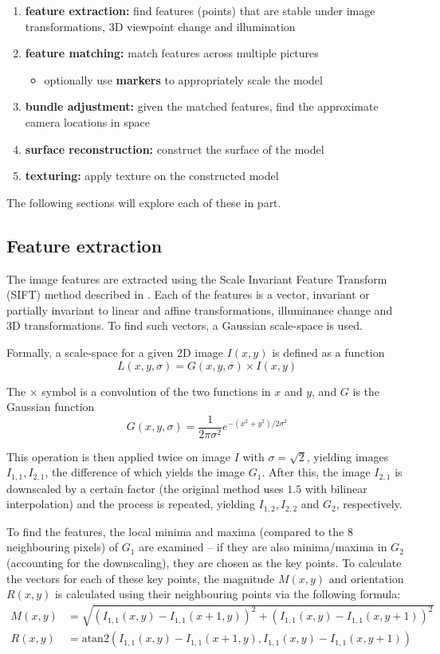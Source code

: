 \begin{enumerate}
	\item \textbf{feature extraction:} find features (points) that are stable under image transformations, 3D viewpoint change and illumination
	\item \textbf{feature matching:} match features across multiple pictures
	\begin{itemize}
		\item optionally use \textbf{markers} to appropriately scale the model
	\end{itemize}
	\item \textbf{bundle adjustment:} given the matched features, find the approximate camera locations in space
	\item \textbf{surface reconstruction:} construct the surface of the model
	\item \textbf{texturing:} apply texture on the constructed model
\end{enumerate}

The following sections will explore each of these in part.

\subsection{Feature extraction}
The image features are extracted using the Scale Invariant Feature Transform (SIFT) method described in \citet{lowe1999object,lowe2004distinctive,}.
Each of the features is a vector, invariant or partially invariant to linear and affine transformations, illuminance change and 3D transformations.
To find such vectors, a Gaussian scale-space is used.

Formally, a scale-space for a given 2D image $I(x, y)$ is defined as a function
$$L(x, y, \sigma) = G(x, y, \sigma) \times I(x, y)$$

The $\times$ symbol is a convolution of the two functions in $x$ and $y$, and $G$ is the Gaussian function
$$G(x, y, \sigma) = \frac{1}{2\pi \sigma^2} e^{-(x^2 + y^2) / 2\sigma^2}$$

This operation is then applied twice on image $I$ with $\sigma = \sqrt{2}$, yielding images $I_{1,1}, I_{2,1}$, the difference of which yields the image $G_1$.
After this, the image $I_{2,1}$ is downscaled by a certain factor (the original method uses $1.5$ with bilinear interpolation) and the process is repeated, yielding $I_{1,2}, I_{2,2}$ and $G_2$, respectively.

To find the features, the local minima and maxima (compared to the 8 neighbouring pixels) of $G_1$ are examined -- if they are also minima/maxima in $G_2$ (accounting for the downscaling), they are chosen as the key points.
To calculate the vectors for each of these key points, the magnitude $M(x,y)$ and orientation $R(x,y)$ is calculated using their neighbouring points via the following formula:
$$
\begin{aligned}
	M(x,y) &= \sqrt{\left(I_{1,1}(x, y) - I_{1,1}(x + 1, y)\right)^2 + \left(I_{1,1}(x,y) - I_{1,1}(x, y + 1)\right)^2} \\[0.7em]
	R(x,y) &= \mathrm{atan2} \left(I_{1,1}(x, y) - I_{1,1}(x + 1, y), I_{1,1}(x,y) - I_{1,1}(x, y + 1)\right)
\end{aligned}
$$

